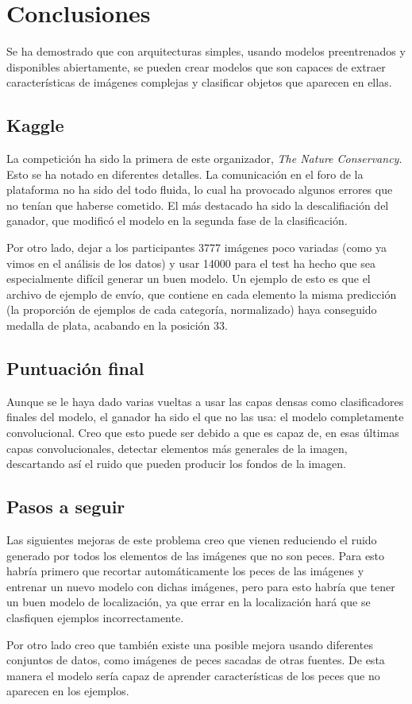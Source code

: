 
\chapter{Conclusiones} %
\label{chap:conclusiones} %

Se ha demostrado que con arquitecturas simples, usando modelos preentrenados y disponibles abiertamente, se pueden crear modelos que son capaces de extraer características de imágenes complejas y clasificar objetos que aparecen en ellas. 

\section{Kaggle}

La competición ha sido la primera de este organizador, \textit{The Nature Conservancy}. Esto se ha notado en diferentes detalles. La comunicación en el foro de la plataforma no ha sido del todo fluida, lo cual ha provocado algunos errores que no tenían que haberse cometido. El más destacado ha sido la descalifiación del ganador, que modificó el modelo en la segunda fase de la clasificación.

Por otro lado, dejar a los participantes 3777 imágenes poco variadas (como ya vimos en el análisis de los datos) y usar 14000 para el test ha hecho que sea especialmente difícil generar un buen modelo. Un ejemplo de esto es que el archivo de ejemplo de envío, que contiene en cada elemento la misma predicción (la proporción de ejemplos de cada categoría, normalizado) haya conseguido medalla de plata, acabando en la posición 33.

\section{Puntuación final}

Aunque se le haya dado varias vueltas a usar las capas densas como clasificadores finales del modelo, el ganador ha sido el que no las usa: el modelo completamente convolucional. Creo que esto puede ser debido a que es capaz de, en esas últimas capas convolucionales, detectar elementos más generales de la imagen, descartando así el ruido que pueden producir los fondos de la imagen.

\section{Pasos a seguir}

Las siguientes mejoras de este problema creo que vienen reduciendo el ruido generado por todos los elementos de las imágenes que no son peces. Para esto habría primero que recortar automáticamente los peces de las imágenes y entrenar un nuevo modelo con dichas imágenes, pero para esto habría que tener un buen modelo de localización, ya que errar en la localización hará que se clasfiquen ejemplos incorrectamente.

Por otro lado creo que también existe una posible mejora usando diferentes conjuntos de datos, como imágenes de peces sacadas de otras fuentes. De esta manera el modelo sería capaz de aprender características de los peces que no aparecen en los ejemplos.
